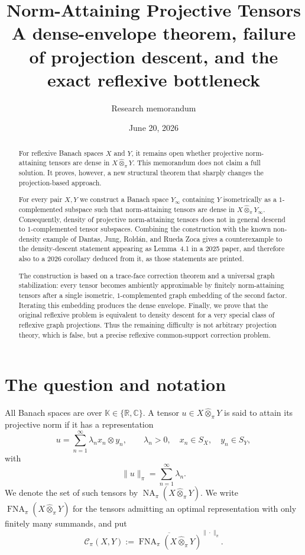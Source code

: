 \documentclass[11pt]{article}
\title{Norm-Attaining Projective Tensors\\
\large A dense-envelope theorem, failure of projection descent, and the exact reflexive bottleneck}
\author{Research memorandum}
\date{June 20, 2026}
\theoremstyle{definition}
\theoremstyle{remark}
\newcommand{\K}{\mathbb K}
\newcommand{\whot}{\widehat\otimes_\pi}
\newcommand{\NA}{\operatorname{NA}_\pi}
\newcommand{\FNA}{\operatorname{FNA}_\pi}
\newcommand{\Cpi}{\mathscr C_\pi}
\newcommand{\cl}{\overline}
\begin{document}
\maketitle

\begin{abstract}
For reflexive Banach spaces $X$ and $Y$, it remains open whether projective norm-attaining tensors are dense in $X\whot Y$.  This memorandum does not claim a full solution.  It proves, however, a new structural theorem that sharply changes the projection-based approach.

For every pair $X,Y$ we construct a Banach space $Y_\infty$ containing $Y$ isometrically as a $1$-complemented subspace such that norm-attaining tensors are dense in $X\whot Y_\infty$.  Consequently, density of projective norm-attaining tensors does not in general descend to $1$-complemented tensor subspaces.  Combining the construction with the known non-density example of Dantas, Jung, Rold\'an, and Rueda Zoca gives a counterexample to the density-descent statement appearing as Lemma~4.1 in a 2025 paper, and therefore also to a 2026 corollary deduced from it, as those statements are printed.

The construction is based on a trace-face correction theorem and a universal graph stabilization: every tensor becomes ambiently approximable by finitely norm-attaining tensors after a single isometric, $1$-complemented graph embedding of the second factor.  Iterating this embedding produces the dense envelope.  Finally, we prove that the original reflexive problem is equivalent to density descent for a very special class of reflexive graph projections.  Thus the remaining difficulty is not arbitrary projection theory, which is false, but a precise reflexive common-support correction problem.
\end{abstract}

\tableofcontents

\section{The question and notation}

All Banach spaces are over $\K\in\{\mathbb R,\mathbb C\}$.  A tensor $u\in X\whot Y$ is said to attain its projective norm if it has a representation
\[
 u=\sum_{n=1}^\infty \lambda_n x_n\otimes y_n,
 \qquad
 \lambda_n>0,\quad x_n\in S_X,\quad y_n\in S_Y,
\]
with
\[
 \|u\|_\pi=\sum_{n=1}^\infty\lambda_n.
\]
We denote the set of such tensors by $\NA(X\whot Y)$.  We write $\FNA(X\whot Y)$ for the tensors admitting an optimal representation with only finitely many summands, and put
\[
 \Cpi(X,Y):=\cl{\FNA(X\whot Y)}^{\|\cdot\|_\pi}.
\]
\end{document}
